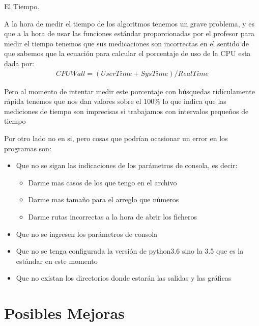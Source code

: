 \documentclass[12pt, fleqn]{article}                             %
\newcommand \Quote {\qq}                                        %
\theoremstyle{break}                                            %
\begin{document}
    El Tiempo.

    A la hora de medir el tiempo de los algoritmos tenemos un grave problema,
    y es que a la hora de usar las funciones estándar proporcionadas por el profesor
    para medir el tiempo tenemos que sus medicaciones son incorrectas en el sentido
    de que sabemos que la ecuación para calcular el porcentaje de uso de la CPU 
    esta dada por:
    \begin{align*}
        CPUWall = (UserTime + SysTime) / RealTime
    \end{align*}

    Pero al momento de intentar medir este porcentaje con búsquedas ridículamente
    rápida tenemos que nos dan valores sobre el 100\% lo que indica que las mediciones
    de tiempo son imprecisas si trabajamos con intervalos pequeños de tiempo

    Por otro lado no \Quote{errores} en si, pero cosas que podrían ocasionar un error
    en los programas son:
    \begin{itemize}
        \item Que no se sigan las indicaciones de los parámetros de consola, es decir:
        \begin{itemize}
            \item Darme mas casos de los que tengo en el archivo
            \item Darme mas tamaño para el arreglo que números
            \item Darme rutas incorrectas a la hora de abrir los ficheros
        \end{itemize}
        \item Que no se ingresen los parámetros de consola
        \item Que no se tenga configurada la versión de python3.6 sino la 3.5 que es
        la estándar en este momento
        \item Que no existan los directorios donde estarán las salidas y las gráficas
    \end{itemize}



\clearpage
\section{Posibles Mejoras}
\end{document}
